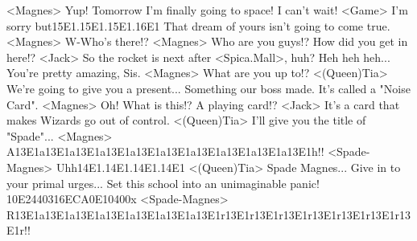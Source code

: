<Magnes> Yup! Tomorrow I'm finally going to space! 
I can't wait! 
<Game> I'm sorry but{15}{E1}.{15}{E1}.{15}{E1}.{16}{E1} That dream of yours isn't going to come true. 
<Magnes> W-Who's there!? 
<Magnes> Who are you guys!? How did you get in here!? 
<Jack> So the rocket is next after <Spica.Mall>, huh? 
Heh heh heh... You're pretty amazing, Sis. 
<Magnes> What are you up to!? 
<(Queen)Tia> We're going to give you a present... Something our boss made. 
It's called a "Noise Card". 
<Magnes> Oh! What is this!? 
A playing card!? 
<Jack> It's a card that makes Wizards go out of control. 
<(Queen)Tia> I'll give you the title of "Spade"... 
<Magnes> A{13}{E1}a{13}{E1}a{13}{E1}a{13}{E1}a{13}{E1}a{13}{E1}a{13}{E1}a{13}{E1}a{13}{E1}a{13}{E1}h!! 
<Spade-Magnes> Uhh{14}{E1}.{14}{E1}.{14}{E1}.{14}{E1} 
<(Queen)Tia> Spade Magnes... Give in to your primal urges... 
Set this school into an unimaginable panic! 
{10}{E2}{44}{03}{16}{EC}{A0}{E1}{04}{00}x 
<Spade-Magnes> R{13}{E1}a{13}{E1}a{13}{E1}a{13}{E1}a{13}{E1}a{13}{E1}a{13}{E1}r{13}{E1}r{13}{E1}r{13}{E1}r{13}{E1}r{13}{E1}r{13}{E1}r{13}{E1}r!! 
